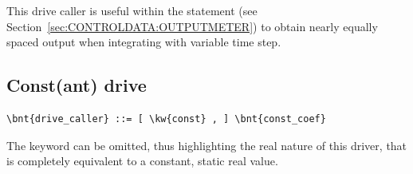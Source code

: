 This drive caller is useful within the  statement
(see Section~\ref{sec:CONTROLDATA:OUTPUTMETER})
to obtain nearly equally spaced output when integrating
with variable time step.

\subsection{Const(ant) drive}
\begin{Verbatim}[commandchars=\\\{\}]
    \bnt{drive_caller} ::= [ \kw{const} , ] \bnt{const_coef}
\end{Verbatim}
The keyword  can be omitted, thus highlighting the real nature
of this driver, that is completely equivalent to a constant, static real
value.

